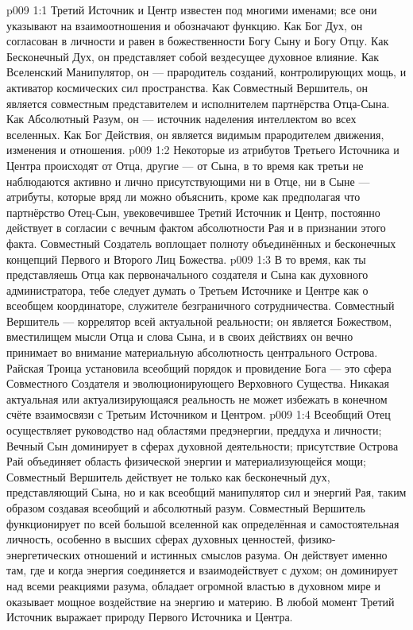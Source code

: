 \vs p009 1:1 Третий Источник и Центр известен под многими именами; все они указывают на взаимоотношения и обозначают функцию. Как Бог Дух, он согласован в личности и равен в божественности Богу Сыну и Богу Отцу. Как Бесконечный Дух, он представляет собой вездесущее духовное влияние. Как Вселенский Манипулятор, он --- прародитель созданий, контролирующих мощь, и активатор космических сил пространства. Как Совместный Вершитель, он является совместным представителем и исполнителем партнёрства Отца\hyp{}Сына. Как Абсолютный Разум, он --- источник наделения интеллектом во всех вселенных. Как Бог Действия, он является видимым прародителем движения, изменения и отношения.
\vs p009 1:2 Некоторые из атрибутов Третьего Источника и Центра происходят от Отца, другие --- от Сына, в то время как третьи не наблюдаются активно и лично присутствующими ни в Отце, ни в Сыне --- атрибуты, которые вряд ли можно объяснить, кроме как предполагая что партнёрство Отец\hyp{}Сын, увековечившее Третий Источник и Центр, постоянно действует в согласии с вечным фактом абсолютности Рая и в признании этого факта. Совместный Создатель воплощает полноту объединённых и бесконечных концепций Первого и Второго Лиц Божества.
\vs p009 1:3 \pc В то время, как ты представляешь Отца как первоначального создателя и Сына как духовного администратора, тебе следует думать о Третьем Источнике и Центре как о всеобщем координаторе, служителе безграничного сотрудничества. Совместный Вершитель --- коррелятор всей актуальной реальности; он является Божеством, вместилищем мысли Отца и слова Сына, и в своих действиях он вечно принимает во внимание материальную абсолютность центрального Острова. Райская Троица установила всеобщий порядок  и провидение Бога --- это сфера Совместного Создателя и эволюционирующего Верховного Существа. Никакая актуальная или актуализирующаяся реальность не может избежать в конечном счёте взаимосвязи с Третьим Источником и Центром.
\vs p009 1:4 \pc Всеобщий Отец осуществляет руководство над областями предэнергии, преддуха и личности; Вечный Сын доминирует в сферах духовной деятельности; присутствие Острова Рай объединяет область физической энергии и материализующейся мощи; Совместный Вершитель действует не только как бесконечный дух, представляющий Сына, но и как всеобщий манипулятор сил и энергий Рая, таким образом создавая всеобщий и абсолютный разум. Совместный Вершитель функционирует по всей большой вселенной как определённая и самостоятельная личность, особенно в высших сферах духовных ценностей, физико\hyp{}энергетических отношений и истинных смыслов разума. Он действует именно там, где и когда энергия соединяется и взаимодействует с духом; он доминирует над всеми реакциями разума, обладает огромной властью в духовном мире и оказывает мощное воздействие на энергию и материю. В любой момент Третий Источник выражает природу Первого Источника и Центра.
